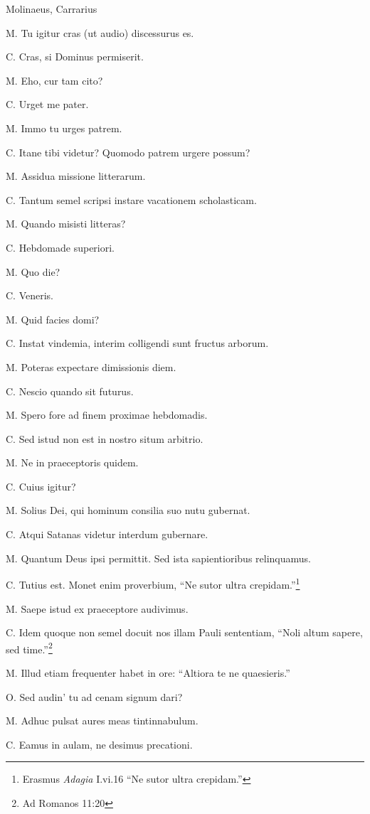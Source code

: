 \documentclass{article}
\begin{document}
Molinaeus, Carrarius

M. Tu igitur cras (ut audio) discessurus es.

C. Cras, si Dominus permiserit.

M. Eho, cur tam cito?

C. Urget me pater.

M. Immo tu urges patrem.

C. Itane tibi videtur? Quomodo patrem urgere possum?

M. Assidua missione litterarum.

C. Tantum semel scripsi instare vacationem scholasticam.

M. Quando misisti litteras?

C. Hebdomade superiori.

M. Quo die?

C. Veneris.

M. Quid facies domi?

C. Instat vindemia, interim colligendi sunt fructus arborum.

M. Poteras expectare dimissionis diem.

C. Nescio quando sit futurus.

M. Spero fore ad finem proximae hebdomadis.

C. Sed istud non est in nostro situm arbitrio.

M. Ne in praeceptoris quidem.

C. Cuius igitur?

M. Solius Dei, qui hominum consilia suo nutu gubernat.

C. Atqui Satanas videtur interdum gubernare.

M. Quantum Deus ipsi permittit. Sed ista sapientioribus relinquamus.

C. Tutius est. Monet enim proverbium, ``Ne sutor ultra crepidam.''\footnote{Erasmus \emph{Adagia} I.vi.16 ``Ne sutor ultra crepidam.''}

M. Saepe istud ex praeceptore audivimus.

C. Idem quoque non semel docuit nos illam Pauli sententiam, ``Noli altum sapere, sed time.''\footnote{Ad Romanos 11:20}

M. Illud etiam frequenter habet in ore: ``Altiora te ne quaesieris.''

O. Sed audin' tu ad cenam signum dari?

M. Adhuc pulsat aures meas tintinnabulum.

C. Eamus in aulam, ne desimus precationi.
\end{document}
